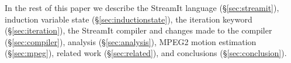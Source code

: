 In the rest of this paper we describe 
the StreamIt language (\S\ref{sec:streamit}), 
induction variable state (\S\ref{sec:inductionstate}), 
the iteration keyword (\S\ref{sec:iteration}), 
the StreamIt compiler and changes made to the compiler (\S\ref{sec:compiler}), 
analysis (\S\ref{sec:analysis}),
MPEG2 motion estimation (\S\ref{sec:mpeg}), 
related work (\S\ref{sec:related}),
and conclusions (\S\ref{sec:conclusion}).








